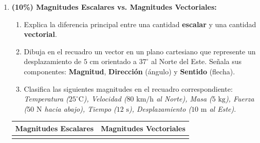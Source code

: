 \documentclass[11pt, letterpaper]{article}
\newif\ifshowanswers
\newcommand{\answer}[1]{
	\ifshowanswers
	\par\vspace{0.15cm}
	\begin{tcolorbox}[colback=blue!5!white, colframe=blue!60!white, arc=1mm, boxrule=0.5pt, title=\textbf{\footnotesize SOLUCIÓN PASO A PASO (DOCENTE)}]
		\color{blue!80!black}\footnotesize #1
	\end{tcolorbox}
	\par\vspace{0.15cm}
	\else
	\par\vspace{0.3cm}
	\fi
}
\begin{document}
\begin{enumerate}[leftmargin=*, itemsep=0.8cm]
		\item \textbf{(10\%) Magnitudes Escalares vs. Magnitudes Vectoriales:}
		\begin{enumerate}[label=\alph*), itemsep=0.2cm]
			\item Explica la diferencia principal entre una cantidad \textbf{escalar} y una cantidad \textbf{vectorial}.
			\item Dibuja en el recuadro un vector en un plano cartesiano que represente un desplazamiento de $5\text{ cm}$ orientado a $37^\circ$ al Norte del Este. Señala sus componentes: \textbf{Magnitud}, \textbf{Dirección} (ángulo) y \textbf{Sentido} (flecha).
			\item Clasifica las siguientes magnitudes en el recuadro correspondiente: 
			\textit{Temperatura ($25^\circ\text{C}$), Velocidad ($80\text{ km/h}$ al Norte), Masa ($5\text{ kg}$), Fuerza ($50\text{ N}$ hacia abajo), Tiempo ($12\text{ s}$), Desplazamiento ($10\text{ m}$ al Este)}.
		\end{enumerate}
		
		\begin{center}
			\small
			\begin{tabular}{|p{7.5cm}|p{7.5cm}|}
				\hline
				\rowcolor{valblue}
				\color{white}\centering\textbf{Magnitudes Escalares} & \color{white}\centering\arraybackslash\textbf{Magnitudes Vectoriales} \\
				\hline
				\rule{0pt}{1.5cm} & \\
				\hline
			\end{tabular}
		\end{center}
		
		\answer{
			\textbf{Solución de escalares y vectores:}
			\begin{itemize}[itemsep=0.15cm]
				\item a) Una cantidad \textbf{escalar} queda totalmente definida con un número (módulo) y una unidad de medida. Una cantidad \textbf{vectorial} requiere además una dirección (ángulo) y un sentido de orientación espacial.
				\item b) En el dibujo del vector: La longitud de la flecha ($5\text{ cm}$) representa la magnitud, la inclinación de $37^\circ$ respecto al eje X positivo representa la dirección, y la punta de la flecha hacia el primer cuadrante marca el sentido.
				\item c) Clasificación: \\
				- \textbf{Escalares:} Temperatura ($25^\circ\text{C}$), Masa ($5\text{ kg}$), Tiempo ($12\text{ s}$). \\
				- \textbf{Vectoriales:} Velocidad ($80\text{ km/h}$ al Norte), Fuerza ($50\text{ N}$ hacia abajo), Desplazamiento ($10\text{ m}$ al Este).
			\end{itemize}
		}
		

\end{enumerate}
\end{document}
